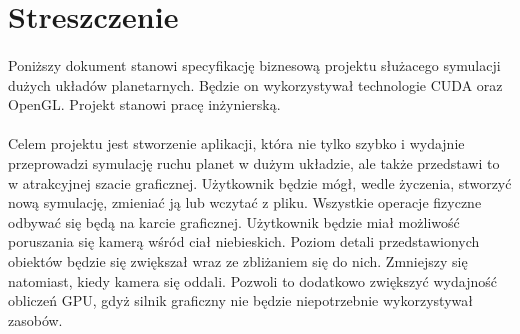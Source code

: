 \section{Streszczenie}\label{sec:wstep}
	
\paragraph{}

Poniższy dokument stanowi specyfikację biznesową projektu służacego symulacji dużych układów planetarnych. Będzie on wykorzystywał technologie CUDA oraz OpenGL. Projekt stanowi pracę inżynierską.

\paragraph{}

Celem projektu jest stworzenie aplikacji, która nie tylko szybko i wydajnie przeprowadzi symulację ruchu planet w dużym układzie, ale także przedstawi to w atrakcyjnej szacie graficznej. Użytkownik będzie mógł, wedle życzenia, stworzyć nową symulację, zmieniać ją lub wczytać z pliku.
Wszystkie operacje fizyczne odbywać się będą na karcie graficznej. Użytkownik będzie miał możliwość poruszania się kamerą wśród ciał niebieskich. Poziom detali przedstawionych obiektów będzie się zwiększał wraz ze zbliżaniem się do nich. Zmniejszy się natomiast, kiedy kamera się oddali. Pozwoli to dodatkowo zwiększyć wydajność obliczeń GPU, gdyż silnik graficzny nie będzie niepotrzebnie wykorzystywał zasobów.
